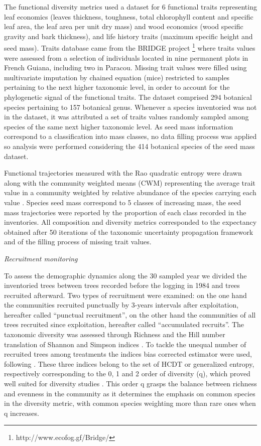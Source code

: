 \documentclass[fleqn,10pt]{ArtEcoFoG} %
\begin{document}
The functional diversity metrics used a dataset for 6 functional traits
representing leaf economics (leaves thickness, toughness, total
chlorophyll content and specific leaf area, the leaf area per unit dry
mass) and wood economics (wood specific gravity and bark thickness), and
life history traits (maximum specific height and seed mass). Traits
database came from the BRIDGE project \footnote{http://www.ecofog.gf/Bridge/}
where traits values were assessed from a selection of individuals
located in nine permanent plots in French Guiana, including two in
Paracou. Missing trait values were filled using multivariate imputation
by chained equation (mice) restricted to samples pertaining to the next
higher taxonomic level, in order to account for the phylogenetic signal
of the functional traits. The dataset comprised 294 botanical species
pertaining to 157 botanical genus. Whenever a species inventoried was
not in the dataset, it was attributed a set of traits values randomly
sampled among species of the same next higher taxonomic level. As seed
mass information correspond to a classification into mass classes, no
data filling process was applied so analysis were performed considering
the 414 botanical species of the seed mass dataset.

Functional trajectories measured with the Rao quadratic entropy were
drawn along with the community weighted means (CWM) representing the
average trait value in a community weighted by relative abundance of the
species carrying each value \citep{Diaz2007, Garnier2004}. Species seed
mass correspond to 5 classes of increasing mass, the seed mass
trajectories were reported by the proportion of each class recorded in
the inventories. All composition and diversity metrics corresponded to
the expectancy obtained after 50 iterations of the taxonomic uncertainty
propagation framework and of the filling process of missing trait
values.

\emph{Recruitment monitoring}

To assess the demographic dynamics along the 30 sampled year we divided
the inventoried trees between trees recorded before the logging in 1984
and trees recruited afterward. Two types of recruitment were examined:
on the one hand the communities recruited punctually by 3-years
intervals after exploitation, hereafter called ``punctual recruitment'',
on the other hand the communities of all trees recruited since
exploitation, hereafter called ``accumulated recruits''. The taxonomic
diversity was assessed through Richness and the Hill number translation
of Shannon and Simpson indices \citep{Hill1973}. To tackle the unequal
number of recruited trees among treatments the indices bias corrected
estimator were used, following \citep{chao2015estimating, Marcon2015b}.
These three indices belong to the set of HCDT or generalized entropy,
respectively corresponding to the 0, 1 and 2 order of diversity (q),
which proved well suited for diversity studies
\citep{Patil1982, Tothmeresz1995}. This order q grasps the balance
between richness and evenness in the community as it determines the
emphasis on common species in the diversity metric, with common species
weighting more than rare ones when q increases.
\end{document}
